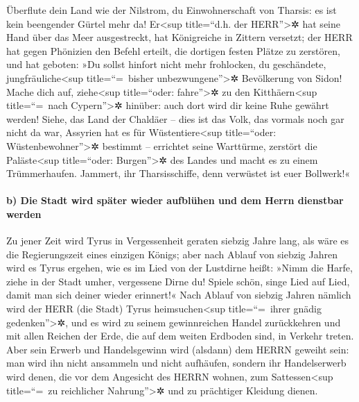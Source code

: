 Überflute dein Land wie der Nilstrom, du Einwohnerschaft
von Tharsis: es ist kein beengender Gürtel mehr da!
Er\textless sup title=``d.h. der HERR''\textgreater✲ hat
seine Hand über das Meer ausgestreckt, hat Königreiche in Zittern
versetzt; der HERR hat gegen Phönizien den Befehl erteilt, die dortigen
festen Plätze zu zerstören, und hat geboten: »Du sollst
hinfort nicht mehr frohlocken, du geschändete,
jungfräuliche\textless sup title=``=~bisher unbezwungene''\textgreater✲
Bevölkerung von Sidon! Mache dich auf, ziehe\textless sup title=``oder:
fahre''\textgreater✲ zu den Kitthäern\textless sup title=``=~nach
Cypern''\textgreater✲ hinüber: auch dort wird dir keine Ruhe gewährt
werden! Siehe, das Land der Chaldäer -- dies ist das
Volk, das vormals noch gar nicht da war, Assyrien hat es für
Wüstentiere\textless sup title=``oder: Wüstenbewohner''\textgreater✲
bestimmt -- errichtet seine Warttürme, zerstört die Paläste\textless sup
title=``oder: Burgen''\textgreater✲ des Landes und macht es zu einem
Trümmerhaufen. Jammert, ihr Tharsisschiffe, denn
verwüstet ist euer Bollwerk!«

\hypertarget{b-die-stadt-wird-spuxe4ter-wieder-aufbluxfchen-und-dem-herrn-dienstbar-werden}{%
\paragraph{b) Die Stadt wird später wieder aufblühen und dem Herrn
dienstbar
werden}\label{b-die-stadt-wird-spuxe4ter-wieder-aufbluxfchen-und-dem-herrn-dienstbar-werden}}

Zu jener Zeit wird Tyrus in Vergessenheit geraten siebzig
Jahre lang, als wäre es die Regierungszeit eines einzigen Königs; aber
nach Ablauf von siebzig Jahren wird es Tyrus ergehen, wie es im Lied von
der Lustdirne heißt: »Nimm die Harfe, ziehe in der Stadt
umher, vergessene Dirne du! Spiele schön, singe Lied auf Lied, damit man
sich deiner wieder erinnert!« Nach Ablauf von siebzig
Jahren nämlich wird der HERR (die Stadt) Tyrus heimsuchen\textless sup
title=``=~ihrer gnädig gedenken''\textgreater✲, und es wird zu seinem
gewinnreichen Handel zurückkehren und mit allen Reichen der Erde, die
auf dem weiten Erdboden sind, in Verkehr treten. Aber
sein Erwerb und Handelsgewinn wird (alsdann) dem HERRN geweiht sein: man
wird ihn nicht ansammeln und nicht aufhäufen, sondern ihr Handelserwerb
wird denen, die vor dem Angesicht des HERRN wohnen, zum
Sattessen\textless sup title=``=~zu reichlicher Nahrung''\textgreater✲
und zu prächtiger Kleidung dienen.

